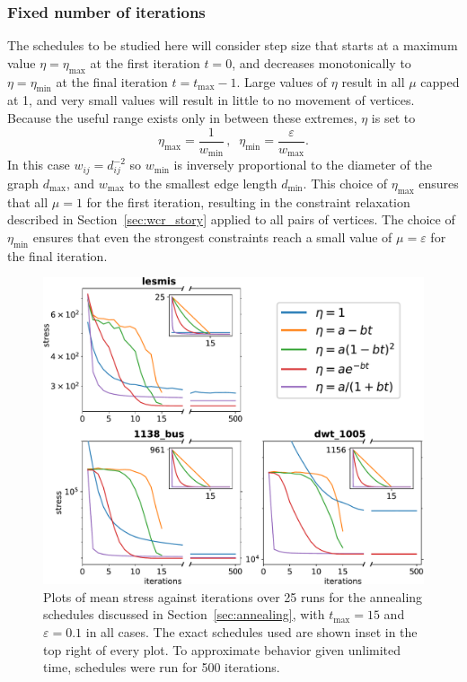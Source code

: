 \subsubsection{Fixed number of iterations}
The schedules to be studied here will consider step size that starts at a maximum value $\eta=\eta_\mathrm{max}$ at the first iteration $t=0$, and decreases monotonically to $\eta=\eta_\mathrm{min}$ at the final iteration $t=t_\mathrm{max}-1$.
Large values of $\eta$ result in all $\mu$ capped at 1, and very small values will result in little to no movement of vertices. Because the useful range exists only in between these extremes, $\eta$ is set to
\begin{equation}
  \eta_{\max} = \frac{1}{w_{\min}} \,,\;\; \eta_{\min} = \frac{\varepsilon}{w_{\max}}.
  \label{eq:etamaxmin}
\end{equation}
In this case $w_{ij} = d_{ij}^{-2}$ so $w_{\min}$ is inversely proportional to the diameter of the graph $d_{\max}$, and $w_{\max}$ to the smallest edge length $d_{\min}$.
This choice of $\eta_{\max}$ ensures that all $\mu = 1$ for the first iteration, resulting in the constraint relaxation described in Section~\ref{sec:wcr_story} applied to all pairs of vertices. The choice of $\eta_{\min}$ ensures that even the strongest constraints reach a small value of $\mu = \varepsilon$ for the final iteration.

\begin{figure}
  \centering
  \includegraphics[width=.85\textwidth]{stress/cooling.pdf}
  \caption[A comparison of different annealing schedules]{Plots of mean stress against iterations over 25 runs for the annealing schedules discussed in Section~\ref{sec:annealing}, with $t_{\max}=15$ and $\varepsilon=0.1$ in all cases. The exact schedules used are shown inset in the top right of every plot.
  To approximate behavior given unlimited time, schedules were run for 500 iterations.
  }
  \label{fig:annealing}
\end{figure}

